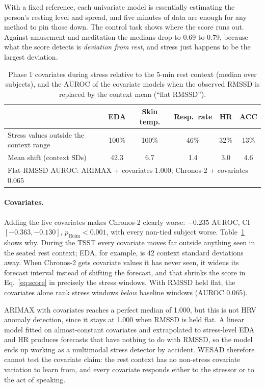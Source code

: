 \documentclass[11pt,a4paper]{article}
\begin{document}
With a fixed reference, each univariate model is essentially estimating the person's resting level and spread, and five minutes of data are enough for any method to pin those down. The control task shows where the score runs out. Against amusement and meditation the medians drop to 0.69 to 0.79, because what the score detects is \emph{deviation from rest}, and stress just happens to be the largest deviation.

\begin{table}[t]
  \centering\small
  \caption{Phase 1 covariates during stress relative to the 5-min rest context (median over subjects), and the AUROC of the covariate models when the observed RMSSD is replaced by the context mean (``flat RMSSD'').}
  \label{tab:ood}
  \begin{tabular}{lccccc}
    \toprule
    & EDA & Skin temp. & Resp.\ rate & HR & ACC \\
    \midrule
    Stress values outside the context range & 100\% & 100\% & 46\% & 32\% & 13\% \\
    Mean shift (context SDs) & 42.3 & 6.7 & 1.4 & 3.0 & 4.6 \\
    \midrule
    \multicolumn{6}{l}{Flat-RMSSD AUROC: ARIMAX + covariates 1.000; Chronos-2 + covariates 0.065} \\
    \bottomrule
  \end{tabular}
\end{table}

\paragraph{Covariates.} Adding the five covariates makes Chronos-2 clearly worse: $-0.235$ AUROC, CI $[-0.363, -0.130]$, $p_\text{Holm}<0.001$, with every non-tied subject worse. Table~\ref{tab:ood} shows why. During the TSST every covariate moves far outside anything seen in the seated rest context; EDA, for example, is 42 context standard deviations away. When Chronos-2 gets covariate values it has never seen, it widens its forecast interval instead of shifting the forecast, and that shrinks the score in Eq.~\eqref{eq:score} in precisely the stress windows. With RMSSD held flat, the covariates alone rank stress windows \emph{below} baseline windows (AUROC 0.065).

ARIMAX with covariates reaches a perfect median of 1.000, but this is not HRV anomaly detection, since it stays at 1.000 when RMSSD is held flat. A linear model fitted on almost-constant covariates and extrapolated to stress-level EDA and HR produces forecasts that have nothing to do with RMSSD, so the model ends up working as a multimodal stress detector by accident. WESAD therefore cannot test the covariate claim: the rest context has no non-stress covariate variation to learn from, and every covariate responds either to the stressor or to the act of speaking.
\end{document}
